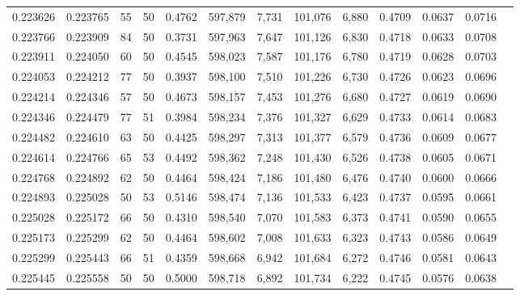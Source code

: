\begin{tabular}{rrrrrrrrrrrrr}
0.223626 & 0.223765 &    55 &  50 &                                     0.4762 & 597,879 &   7,731 & 101,076 &   6,880 & 0.4709 & 0.0637 & 0.0716 \\
0.223766 & 0.223909 &    84 &  50 &                                     0.3731 & 597,963 &   7,647 & 101,126 &   6,830 & 0.4718 & 0.0633 & 0.0708 \\
0.223911 & 0.224050 &    60 &  50 &                                     0.4545 & 598,023 &   7,587 & 101,176 &   6,780 & 0.4719 & 0.0628 & 0.0703 \\
0.224053 & 0.224212 &    77 &  50 &                                     0.3937 & 598,100 &   7,510 & 101,226 &   6,730 & 0.4726 & 0.0623 & 0.0696 \\
0.224214 & 0.224346 &    57 &  50 &                                     0.4673 & 598,157 &   7,453 & 101,276 &   6,680 & 0.4727 & 0.0619 & 0.0690 \\
0.224346 & 0.224479 &    77 &  51 &                                     0.3984 & 598,234 &   7,376 & 101,327 &   6,629 & 0.4733 & 0.0614 & 0.0683 \\
0.224482 & 0.224610 &    63 &  50 &                                     0.4425 & 598,297 &   7,313 & 101,377 &   6,579 & 0.4736 & 0.0609 & 0.0677 \\
0.224614 & 0.224766 &    65 &  53 &                                     0.4492 & 598,362 &   7,248 & 101,430 &   6,526 & 0.4738 & 0.0605 & 0.0671 \\
0.224768 & 0.224892 &    62 &  50 &                                     0.4464 & 598,424 &   7,186 & 101,480 &   6,476 & 0.4740 & 0.0600 & 0.0666 \\
0.224893 & 0.225028 &    50 &  53 &                                     0.5146 & 598,474 &   7,136 & 101,533 &   6,423 & 0.4737 & 0.0595 & 0.0661 \\
0.225028 & 0.225172 &    66 &  50 &                                     0.4310 & 598,540 &   7,070 & 101,583 &   6,373 & 0.4741 & 0.0590 & 0.0655 \\
0.225173 & 0.225299 &    62 &  50 &                                     0.4464 & 598,602 &   7,008 & 101,633 &   6,323 & 0.4743 & 0.0586 & 0.0649 \\
0.225299 & 0.225443 &    66 &  51 &                                     0.4359 & 598,668 &   6,942 & 101,684 &   6,272 & 0.4746 & 0.0581 & 0.0643 \\
0.225445 & 0.225558 &    50 &  50 &                                     0.5000 & 598,718 &   6,892 & 101,734 &   6,222 & 0.4745 & 0.0576 & 0.0638 \\

\end{tabular}
